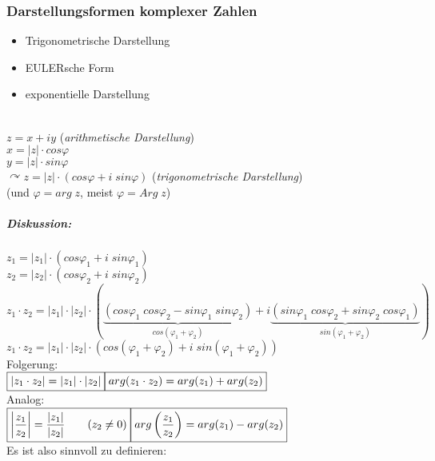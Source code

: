 \subsubsection{Darstellungsformen komplexer Zahlen}
\begin{itemize}
\item Trigonometrische Darstellung
\item EULERsche Form
\item exponentielle Darstellung
\end{itemize}
\\
$\boxed{z=x+iy}$ \qquad (\emph{arithmetische Darstellung})\\
$x=|z|\cdot cos \varphi$\\
$y=|z|\cdot sin \varphi$\\
$\curvearrowright \boxed{z=|z|\cdot (cos\varphi + i\; sin \varphi)}$ \qquad (\emph{trigonometrische Darstellung})\\
(und $\varphi=arg\; z$, meist $\varphi = Arg \; z$)
\subparagraph{Diskussion:} \parskp
$z_1= |z_1|\cdot (cos \varphi_1 + i \; sin \varphi_1)$\\
$z_2= |z_2|\cdot (cos \varphi_2 + i \; sin \varphi_2)$\medskip\\
$z_1 \cdot z_2 = |z_1| \cdot |z_2| \cdot ( \underbrace{(cos\varphi_1 \; cos \varphi_2 - sin\varphi_1 \; sin \varphi_2)}_{cos(\varphi_1+\varphi_2)}+i\underbrace{(sin \varphi_1 \; cos \varphi_2 + sin \varphi_2 \; cos \varphi_1)}_{sin(\varphi_1+\varphi_2)})$\\
$\boxed{z_1 \cdot z_2 = |z_1| \cdot |z_2| \cdot(cos (\varphi_1+\varphi_2)+i\; sin (\varphi_1+\varphi_2))}$\\
Folgerung:\\
$\boxed{|z_1\cdot z_2| = |z_1| \cdot |z_2|}\\
\boxed{arg(z_1\cdot z_2)=arg(z_1)+arg(z_2)}$\\
Analog:\\
$\boxed{\left|\frac{z_1}{z_2}\right| = \frac{|z_1|}{|z_2|} \qquad (z_2 \not = 0)} \\
\boxed{arg\left(\frac{z_1}{z_2}\right) = arg(z_1) - arg (z_2)}$\\
Es ist also sinnvoll zu definieren:
